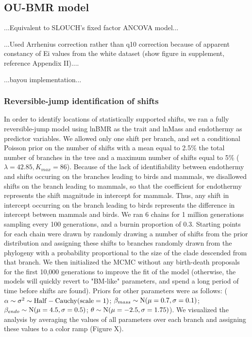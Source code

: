 \documentclass[a4paper,11pt]{article}
\begin{document}

\subsection*{OU-BMR model} 

...Equivalent to SLOUCH's fixed factor ANCOVA model...

...Used Arrhenius correction rather than q10 correction because of apparent constancy of Ei values from the white dataset (show figure in supplement, reference Appendix II)....

...bayou implementation...

\subsubsection*{Reversible-jump identification of shifts}
In order to identify locations of statistically supported shifts, we ran a fully reversible-jump model using lnBMR as the trait and lnMass and endothermy as predictor variables. We allowed only one shift per branch, and set a conditional Poisson prior on the number of shifts with a mean equal to 2.5\% the total number of branches in the tree and a maximum number of shifts equal to 5\% ($\lambda = 42.85, K_{max} = 86$). Because of the lack of identifiability between endothermy and shifts occuring on the branches leading to birds and mammals, we disallowed shifts on the branch leading to mammals, so that the coefficient for endothermy represents the shift magnitude in intercept for mammals. Thus, any shift in intercept occurring on the branch leading to birds represents the difference in intercept between mammals and birds. We ran 6 chains for 1 million generations sampling every 100 generations, and a burnin proportion of 0.3. Starting points for each chain were drawn by randomly drawing a number of shifts from the prior distribution and assigning these shifts to branches randomly drawn from the phylogeny with a probability proportional to the size of the clade descended from that branch. We then initialized the MCMC without any birth-death proposals for the first 10,000 generations to improve the fit of the model (otherwise, the models will quickly revert to "BM-like" parameters, and spend a long period of time before shifts are found). Priors for other parameters were as follows: ($\alpha \sim \sigma^2 \sim \rm{Half-Cauchy}(\rm{scale}=1)$; $\beta_{mass} \sim \rm{N}(\mu = 0.7, \sigma=0.1)$; $\beta_{endo} \sim \rm{N}(\mu=4.5, \sigma=0.5)$; $\theta \sim \rm{N}(\mu=-2.5, \sigma=1.75)$). We visualized the analysis by averaging the values of all parameters over each branch and assigning these values to a color ramp (Figure X). \\
\end{document}
